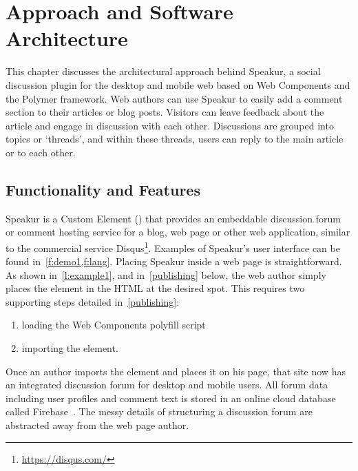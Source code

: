 \chapter{Approach and Software Architecture}
%
\label{ch:approach}

This chapter discusses the architectural approach behind Speakur, 
a social discussion plugin for the desktop and mobile web based on Web Components and the Polymer framework.
Web authors can use Speakur to easily add a comment section to their articles or blog posts.
Visitors can leave feedback about the article and engage in discussion with each other.
Discussions are grouped into topics or `threads', and within these threads, users can reply to the main article or to each other.

\section{Functionality and Features}
Speakur 
is a Custom Element 
() 
that provides an embeddable discussion forum or comment hosting service for a blog, web page or other web application, similar to the commercial service Disqus\footnote{\url{https://disqus.com/}}.
Examples of Speakur's user interface can be found in~\cref{f:demo1,f:lang}.
Placing Speakur inside a web page is straightforward.
As shown in~\cref{l:example1},
and in~\cref{publishing} below,
the web author simply places the 
 element in the HTML at the desired spot.
This requires two supporting steps detailed in~\cref{publishing}:
\begin{enumerate}
\item loading the Web Components polyfill script
\item importing the  element.
\end{enumerate}

Once an author imports the element and places it on his page, that site now has an integrated discussion forum for desktop and mobile users. 
All forum data including user profiles and comment text is stored in an online cloud database called Firebase~\cite{firebasecontributors2015}.
The messy details of structuring a discussion forum are abstracted away from the web page author.

